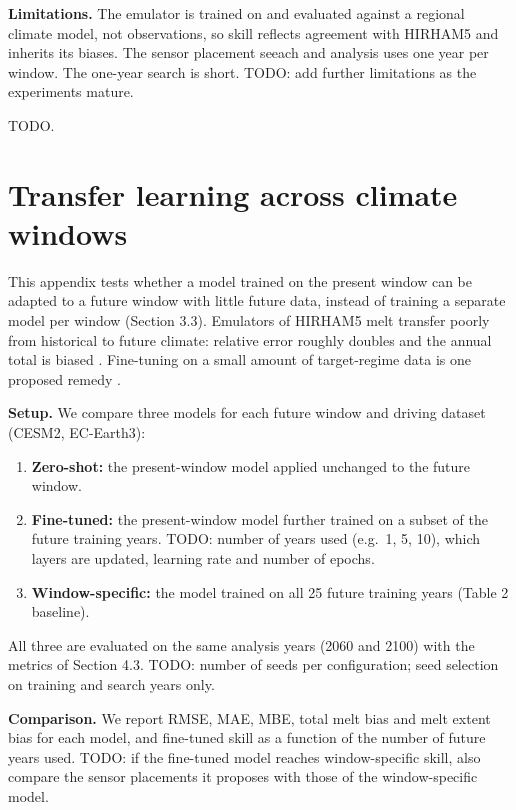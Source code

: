 \documentclass[tc, manuscript]{copernicus}
\providecommand{\tightlist}{\setlength{\itemsep}{0pt}\setlength{\parskip}{0pt}}
\begin{document}
\textbf{Limitations.} The emulator is trained on and evaluated against a
regional climate model, not observations, so skill reflects agreement
with HIRHAM5 and inherits its biases. The sensor placement seeach and
analysis uses one year per window. The one-year search is short. TODO:
add further limitations as the experiments mature.

\conclusions

TODO.


\appendix

\section{Transfer learning across climate
windows}\label{appendix-a-transfer-learning-across-climate-windows}

This appendix tests whether a model trained on the present window can be
adapted to a future window with little future data, instead of training
a separate model per window (Section 3.3). Emulators of HIRHAM5 melt
transfer poorly from historical to future climate: relative error
roughly doubles and the annual total is biased
\citep{schlager_preprint}. Fine-tuning on a small amount of
target-regime data is one proposed remedy \citep{dheeshjith2024}.

\textbf{Setup.} We compare three models for each future window and
driving dataset (CESM2, EC-Earth3):

\begin{enumerate}
\def\labelenumi{\arabic{enumi}.}
\tightlist
\item
  \textbf{Zero-shot:} the present-window model applied unchanged to the
  future window.
\item
  \textbf{Fine-tuned:} the present-window model further trained on a
  subset of the future training years. TODO: number of years used
  (e.g.~1, 5, 10), which layers are updated, learning rate and number of
  epochs.
\item
  \textbf{Window-specific:} the model trained on all 25 future training
  years (Table 2 baseline).
\end{enumerate}

All three are evaluated on the same analysis years (2060 and 2100) with
the metrics of Section 4.3. TODO: number of seeds per configuration;
seed selection on training and search years only.

\textbf{Comparison.} We report RMSE, MAE, MBE, total melt bias and melt
extent bias for each model, and fine-tuned skill as a function of the
number of future years used. TODO: if the fine-tuned model reaches
window-specific skill, also compare the sensor placements it proposes
with those of the window-specific model.
\end{document}

